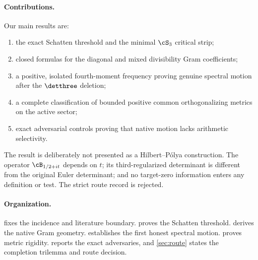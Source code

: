 \paragraph{Contributions.}
Our main results are:
\begin{enumerate}
  \item the exact Schatten threshold and the minimal $\cS_3$ critical
    strip;
  \item closed formulas for the diagonal and mixed divisibility Gram
    coefficients;
  \item a positive, isolated fourth-moment frequency proving genuine
    spectral motion after the $\detthree$ deletion;
  \item a complete classification of bounded positive common
    orthogonalizing metrics on the active sector;
  \item exact adversarial controls proving that native motion lacks
    arithmetic selectivity.
\end{enumerate}

The result is deliberately not presented as a Hilbert--P\'olya
construction.  The operator $\cB_{1/2+it}$ depends on $t$; its
third-regularized determinant is different from the original Euler
determinant; and no target-zero information enters any definition or
test.  The strict route record is rejected.

\paragraph{Organization.}
 fixes the incidence and literature boundary.
 proves the Schatten threshold.
 derives the native Gram geometry.
 establishes the first honest spectral motion.
 proves metric rigidity.
 reports the exact adversaries, and
\cref{sec:route} states the completion trilemma and route decision.
